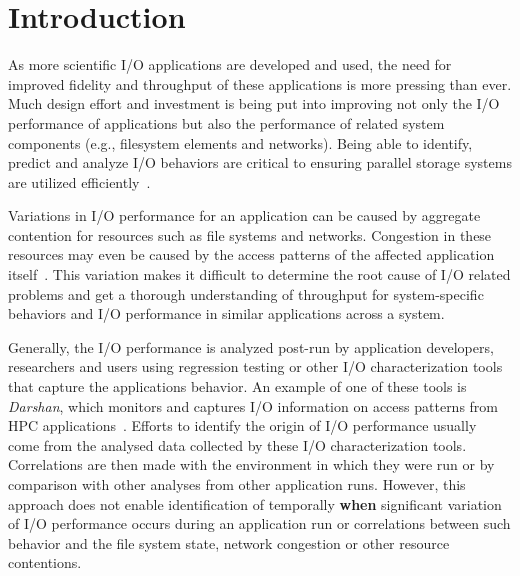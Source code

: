 \section{Introduction}
As more scientific I/O applications are developed and used, the need for
improved fidelity and throughput of these applications is more pressing than ever. 
Much design effort and investment is being put into improving not only
the I/O performance of applications but also the performance of related
system components (e.g., filesystem elements and networks). Being able to
identify, predict and analyze I/O behaviors are critical to ensuring
parallel storage systems are utilized efficiently~\cite{costa2021}. 


Variations in I/O performance for an application can be caused by 
aggregate contention for resources such as file systems and networks. 
Congestion in these resources may even be caused by the access patterns 
of the affected application itself~\cite{I/O-performance-variation}.
This variation
makes it difficult to determine the root cause of I/O related problems
and get a thorough understanding of throughput for system-specific
behaviors and I/O performance in similar applications across a
system. 

Generally, the I/O performance is analyzed post-run by application
developers, researchers and users using regression testing or
other I/O characterization tools that capture the applications behavior. An example of one of these tools is \emph{Darshan}, which
monitors and captures I/O information on access patterns from HPC
applications~\cite{Darshan}.
Efforts to identify the origin of I/O performance usually come from the analysed data 
collected by these I/O characterization tools. Correlations are then made with the environment 
in which they were run or by comparison with other analyses from 
other application runs.
However, this approach does not enable identification of
temporally \textbf{when} significant variation of I/O performance 
occurs during an application run or
correlations between such behavior and the file system state, 
network congestion or other resource contentions.

